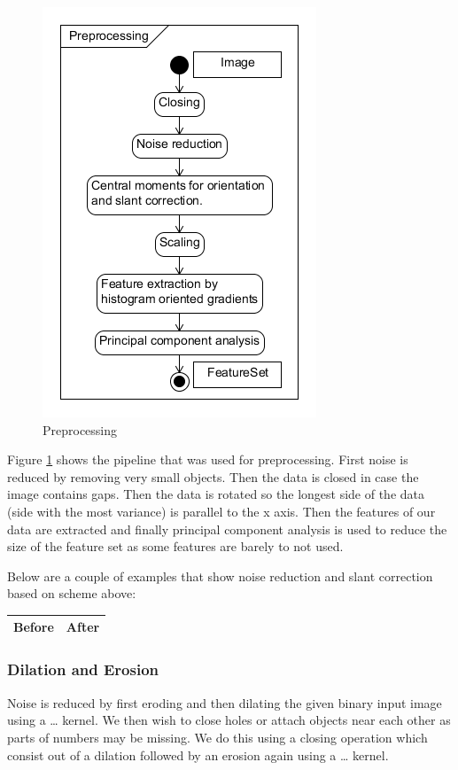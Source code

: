 \documentclass[%
        compressed,
        final,
        notitlepage,
        narroweqnarray,
        inline,
        twoside,
        ]{ieee}
\begin{document}
\begin{figure}
    \centering
    \includegraphics[width=.5\textwidth]{preprocessing2.png}
    \caption{Preprocessing}
    \label{fig:preprocessing}
\end{figure}

Figure \ref{fig:preprocessing} shows the pipeline that was used for preprocessing. First noise is reduced by removing very small objects. Then the data is closed in case the image contains gaps. Then the data is rotated so the longest side of the data (side with the most variance) is parallel to the x axis. Then the features of our data are extracted and finally principal component analysis is used to reduce the size of the feature set as some features are barely to not used.

Below are a couple of examples that show noise reduction and slant correction based on scheme above:


\begin{tabular}{|c|c|}
    \hline
    Before & After \\
    \hline
    \hline
\end{tabular}

\subsubsection{Dilation and Erosion}
Noise is reduced by first eroding and then dilating the given binary input image using a … kernel. We then wish to close holes or attach objects near each other as parts of numbers may be missing. We do this using a closing operation which consist out of a dilation followed by an erosion again using a … kernel.
\end{document}

